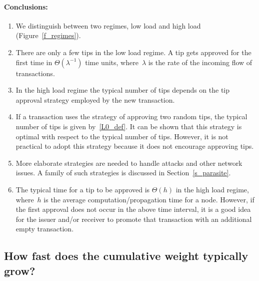 \documentclass[12pt]{article}
\begin{document}
\paragraph{Conclusions:}
\begin{enumerate}
 \item We distinguish between two regimes, low load and high
load (Figure~\ref{f_regimes}).
 \item There are only a few tips in the low load regime.
 A
 tip gets approved for the first
time in $\Theta(\lambda^{-1})$ time units, where~$\lambda$ is the rate of the 
incoming flow of transactions.
 \item In the high load regime the typical number 
of tips depends on the tip approval strategy employed by the new 
transaction. 
 \item If a transaction uses the strategy of approving two 
 random tips, the typical number of tips is given by~\eqref{L0_def}. 
 It can be shown 
that this strategy is optimal with respect to the typical
number of tips. However, it is not practical to adopt this strategy
because it does not encourage approving tips.
 \item More elaborate strategies are needed to handle attacks 
 and other network issues. A family 
of such strategies 
is discussed in Section~\ref{s_parasite}.
 \item The typical time for a 
tip to be approved is $\Theta(h)$ in the high load regime, where~$h$ 
is the average computation/propagation time for a node. However, 
if the first approval does not occur in the above time interval,
it is a good idea for the issuer and/or receiver
to promote that transaction with an additional empty transaction.
\end{enumerate}




\subsection{How fast does the cumulative weight typically grow?}
\label{s_cum_grow}
\end{document}
